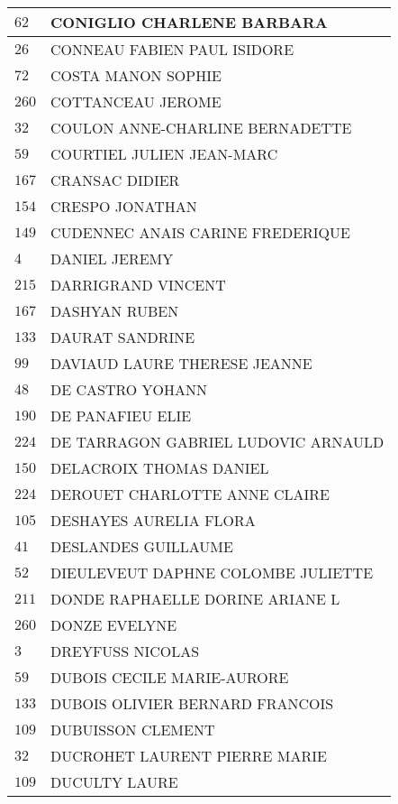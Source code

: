 \begin{xltabular}{\linewidth}{|l|X|}
    $62$ & CONIGLIO CHARLENE BARBARA \\
    \hline
    $26$ & CONNEAU FABIEN PAUL ISIDORE \\
    \hline
    $72$ & COSTA MANON SOPHIE \\
    \hline
    $260$ & COTTANCEAU JEROME \\
    \hline
    $32$ & COULON ANNE-CHARLINE BERNADETTE \\
    \hline
    $59$ & COURTIEL JULIEN JEAN-MARC \\
    \hline
    $167$ & CRANSAC DIDIER \\
    \hline
    $154$ & CRESPO JONATHAN \\
    \hline
    $149$ & CUDENNEC ANAIS CARINE FREDERIQUE \\
    \hline
    $4$ & DANIEL JEREMY \\
    \hline
    $215$ & DARRIGRAND VINCENT \\
    \hline
    $167$ & DASHYAN RUBEN \\
    \hline
    $133$ & DAURAT SANDRINE \\
    \hline
    $99$ & DAVIAUD LAURE THERESE JEANNE \\
    \hline
    $48$ & DE CASTRO YOHANN \\
    \hline
    $190$ & DE PANAFIEU ELIE \\
    \hline
    $224$ & DE TARRAGON GABRIEL LUDOVIC ARNAULD \\
    \hline
    $150$ & DELACROIX THOMAS DANIEL \\
    \hline
    $224$ & DEROUET CHARLOTTE ANNE CLAIRE \\
    \hline
    $105$ & DESHAYES AURELIA FLORA \\
    \hline
    $41$ & DESLANDES GUILLAUME \\
    \hline
    $52$ & DIEULEVEUT DAPHNE COLOMBE JULIETTE \\
    \hline
    $211$ & DONDE RAPHAELLE DORINE ARIANE L \\
    \hline
    $260$ & DONZE EVELYNE \\
    \hline
    $3$ & DREYFUSS NICOLAS \\
    \hline
    $59$ & DUBOIS CECILE MARIE-AURORE \\
    \hline
    $133$ & DUBOIS OLIVIER BERNARD FRANCOIS \\
    \hline
    $109$ & DUBUISSON CLEMENT \\
    \hline
    $32$ & DUCROHET LAURENT PIERRE MARIE \\
    \hline
    $109$ & DUCULTY LAURE \\

\end{xltabular}
